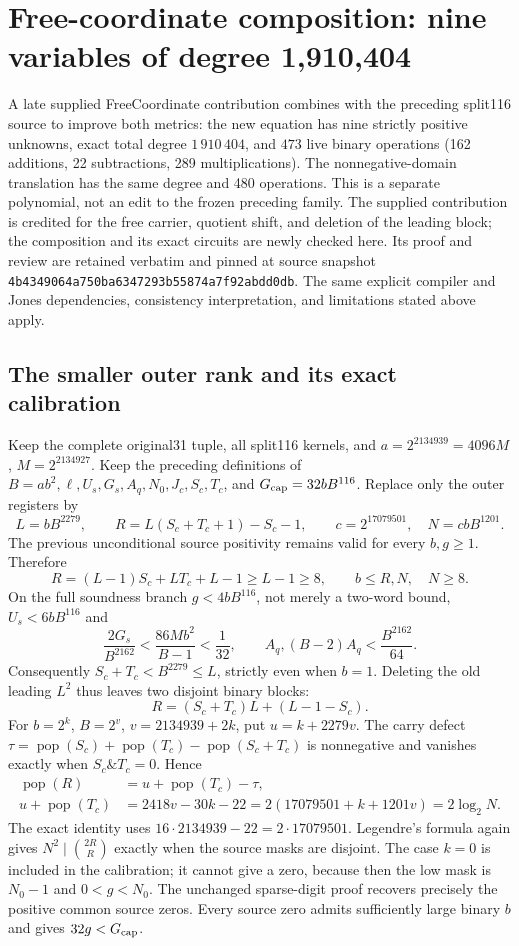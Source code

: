 \section{Free-coordinate composition: nine variables of degree 1,910,404}
\label{sec:nine-free-coordinate}

A late supplied FreeCoordinate contribution combines with the preceding
split116 source to improve both metrics: the new equation has nine strictly
positive unknowns, exact total degree \(1\,910\,404\), and \(473\) live
binary operations (162 additions, 22 subtractions, 289 multiplications).
The nonnegative-domain translation has the same degree and 480 operations.
This is a separate polynomial, not an edit to the frozen preceding family.
The supplied contribution is credited for the free carrier, quotient shift,
and deletion of the leading block; the composition and its exact circuits
are newly checked here. Its proof and review are retained verbatim and
pinned at source snapshot \texttt{4b4349064a750ba6347293b55874a7f92abdd0db}.
The same explicit compiler and Jones dependencies, consistency interpretation,
and limitations stated above apply.

\subsection{The smaller outer rank and its exact calibration}
Keep the complete original31 tuple, all split116 kernels, and
\(a=2^{2134939}=4096M\), \(M=2^{2134927}\). Keep the preceding definitions
of \(B=ab^2,\ell,U_s,G_s,A_q,N_0,J_c,S_c,T_c\), and
\(G_{\rm cap}=32bB^{116}\). Replace only the outer registers by
\[
 L=bB^{2279},\qquad
 R=L(S_c+T_c+1)-S_c-1,\qquad
 c=2^{17079501},\quad N=cbB^{1201}.
\]
The previous unconditional source positivity remains valid for every
\(b,g\ge1\). Therefore
\[
 R=(L-1)S_c+LT_c+L-1\ge L-1\ge8,
 \qquad b\le R,N,\quad N\ge8.
\]
On the full soundness branch \(g<4bB^{116}\), not merely a two-word bound,
\(U_s<6bB^{116}\) and
\[
 \frac{2G_s}{B^{2162}}<\frac{86Mb^2}{B-1}<\frac1{32},
 \qquad A_q,(B-2)A_q<\frac{B^{2162}}{64}.
\]
Consequently \(S_c+T_c<B^{2279}\le L\), strictly even when \(b=1\).
Deleting the old leading \(L^2\) thus leaves two disjoint binary blocks:
\[
 R=(S_c+T_c)L+(L-1-S_c).
\]
For \(b=2^k\), \(B=2^v\), \(v=2134939+2k\), put
\(u=k+2279v\). The carry defect
\(\tau=\operatorname{pop}(S_c)+\operatorname{pop}(T_c)
-\operatorname{pop}(S_c+T_c)\) is nonnegative and vanishes exactly when
\(S_c\mathbin{\&}T_c=0\). Hence
\begin{align*}
 \operatorname{pop}(R)&=u+\operatorname{pop}(T_c)-\tau,\\
 u+\operatorname{pop}(T_c)&=2418v-30k-22
 =2(17079501+k+1201v)=2\log_2N.
\end{align*}
The exact identity uses \(16\cdot2134939-22=2\cdot17079501\).
Legendre's formula again gives
\(N^2\mid\binom{2R}{R}\) exactly when the source masks are disjoint.
The case \(k=0\) is included in the calibration; it cannot give a zero,
because then the low mask is \(N_0-1\) and \(0<g<N_0\).
The unchanged sparse-digit proof recovers precisely the positive common
source zeros. Every source zero admits sufficiently large binary \(b\)
and gives \(32g<G_{\rm cap}\).

